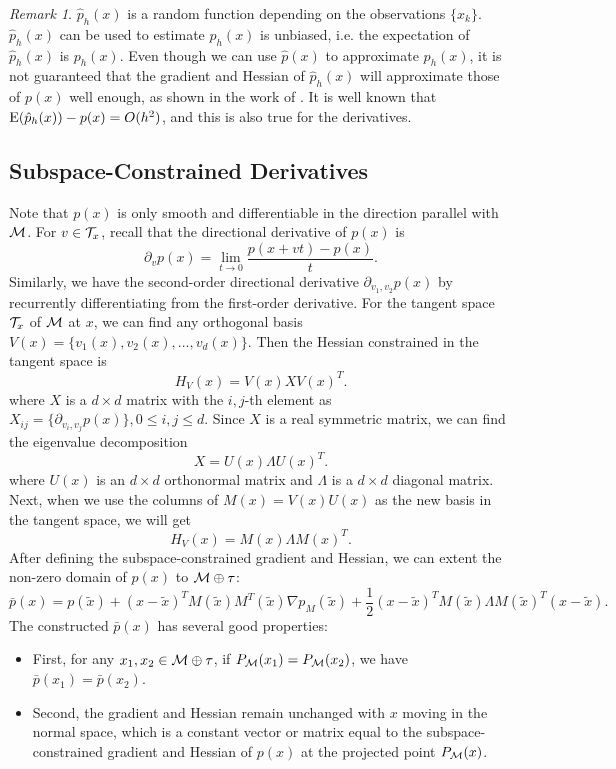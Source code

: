 \documentclass[aos,preprint]{imsart}
\theoremstyle{remark}
\newtheorem*{remark}{Remark}
\begin{document}
\begin{remark}   
 $\hat{p}_h(x)$ is a random function depending on the observations $\{x_k\}$. $\hat{p}_h(x)$ can be used to estimate $p_h(x)$ is unbiased, i.e. the expectation of $\hat{p}_h(x)$ is $p_h(x)$. Even though we can use $ \hat{p}(x)$ to approximate $p_h(x)$, it is not guaranteed that the gradient and Hessian of $\hat{p}_h(x)$ will approximate those of $p(x)$ well enough, as shown in the work of \cite{sasaki2017mode}.
  It is well known that ${\rm E}(\hat{p}_h(x))-p(x) = O(h^2)$, and this is also true for the derivatives.
\end{remark}



\subsection{Subspace-Constrained Derivatives}
Note that $p(x)$ is only smooth and differentiable in the direction parallel with $\cal M$. For $v\in {\cal T}_x$, recall that the directional derivative of $p(x)$ is
\[
 \partial_v p(x) = \lim_{t\rightarrow 0} \frac{p(x+vt)-p(x)}{t}.
\]
Similarly, we have the second-order directional derivative $\partial_{v_1,v_2}p(x)$ by recurrently differentiating from the first-order derivative. For the tangent space ${\cal T}_x$ of $\cal M$ at $x$, we can find any orthogonal basis $V(x) = \{v_1(x), v_2(x),..., v_d(x)\}$. Then the Hessian constrained in the tangent space is
\[
H_{ V}(x) = V(x) X V(x)^T.
\]
where $X$ is a $d\times d$ matrix with the $i,j$-th element as $X_{ij}=  \{ \partial_{v_i,v_j} p(x )\}, 0\leq i,j \leq d$. Since $X$ is a real symmetric matrix, we can find the eigenvalue decomposition 
\[
X = U(x) \Lambda U(x)^T.
\]
where $U(x)$ is an $d\times d$ orthonormal matrix and $\Lambda$ is a $d\times d$ diagonal matrix. Next, when we use the columns of $M(x) = V(x)U(x)$ as the new basis in the tangent space, we will get 
\[
H_{V}(x) = M(x) \Lambda M(x)^T.
\]
After defining the subspace-constrained gradient and Hessian, we can extent the non-zero domain of $p(x)$ to  $\cal M\oplus \tau$:
\[
\bar{p}(x) = p(\tilde{x}) + (x-\tilde{x})^T M(\tilde{x}) M^T(\tilde{x}) \nabla p_M (\tilde{x}) +\frac{1}{2}  (x-\tilde{x})^TM(\tilde{x})\Lambda M(\tilde{x})^T (x-\tilde{x}).
\]
The constructed $\bar{p}(x)$ has several good properties: 
\begin{itemize}
\item First, for any $x_1,x_2 \in \cal M\oplus \tau$, if $P_{\cal M}(x_1) = P_{\cal M}(x_2)$, we have $\bar{p}(x_1) = \bar{p}(x_2)$. 
\item Second, the gradient and Hessian remain unchanged with $x$ moving in the normal space, which is a constant vector or matrix equal to the subspace-constrained gradient and Hessian of $p(x)$ at the projected point $P_{\cal M}(x)$.
\end{itemize}
\end{document}
